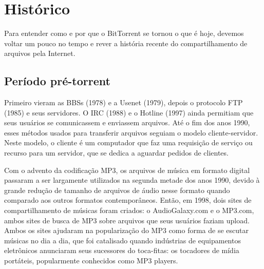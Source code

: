 
\chapter{Histórico}

\begin{comment}
    Vou contar a história do BitTorrent, desde o aumento do uso de transferências de dados via internet, passando pela criação de
    protocolos e softwares usados para baixar arquivos de forma ilegal, até a sua criação e o boom de usuários que o utilizam para
    essa motivação. Em paralelo, discutirei os motivos legais pelos quais os softwares anteriores foram descontinuados, que influenciaram
    diretamente na sua criação.

    Separarei em 3 períodos: o antes, a criação e as consequências disso no mundo.
\end{comment}

Para entender como e por que o BitTorrent se tornou o que é hoje, devemos voltar um pouco no tempo e rever a história recente do
compartilhamento de arquivos pela Internet.

\section{Período pré-torrent}

Primeiro vieram as BBSs (1978) e a Usenet (1979), depois o protocolo FTP (1985) e seus servidores. O IRC (1988) e o Hotline (1997) ainda
permitiam que seus usuários se comunicassem e enviassem arquivos. Até o fim dos anos 1990, esses métodos usados para transferir arquivos
seguiam o modelo cliente-servidor. Neste modelo, o cliente é um computador que faz uma requisição de serviço ou recurso para um servidor,
que se dedica a aguardar pedidos de clientes.

Com o advento da codificação MP3, os arquivos de música em formato digital passaram a ser largamente utilizados na segunda metade dos anos
1990, devido à grande redução de tamanho de arquivos de áudio nesse formato quando comparado aos outros formatos contemporâneos. Então, em
1998, dois sites de compartilhamento de músicas foram criados: o AudioGalaxy.com e o MP3.com, ambos sites de busca de MP3 sobre arquivos
que seus usuários faziam upload. Ambos os sites ajudaram na popularização do MP3 como forma de se escutar músicas no dia a dia, que foi
catalisado quando indústrias de equipamentos eletrônicos anunciaram seus sucessores do toca-fitas: os tocadores de mídia portáteis,
popularmente conhecidos como MP3 players.

